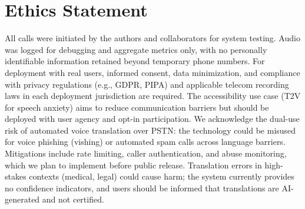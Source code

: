 \documentclass[11pt]{article}
\begin{document}
\section*{Ethics Statement}

All calls were initiated by the authors and collaborators for system testing. Audio was logged for debugging and aggregate metrics only, with no personally identifiable information retained beyond temporary phone numbers. For deployment with real users, informed consent, data minimization, and compliance with privacy regulations (e.g., GDPR, PIPA) and applicable telecom recording laws in each deployment jurisdiction are required. The accessibility use case (T2V for speech anxiety) aims to reduce communication barriers but should be deployed with user agency and opt-in participation. We acknowledge the dual-use risk of automated voice translation over PSTN: the technology could be misused for voice phishing (vishing) or automated spam calls across language barriers. Mitigations include rate limiting, caller authentication, and abuse monitoring, which we plan to implement before public release. Translation errors in high-stakes contexts (medical, legal) could cause harm; the system currently provides no confidence indicators, and users should be informed that translations are AI-generated and not certified.


\end{document}
